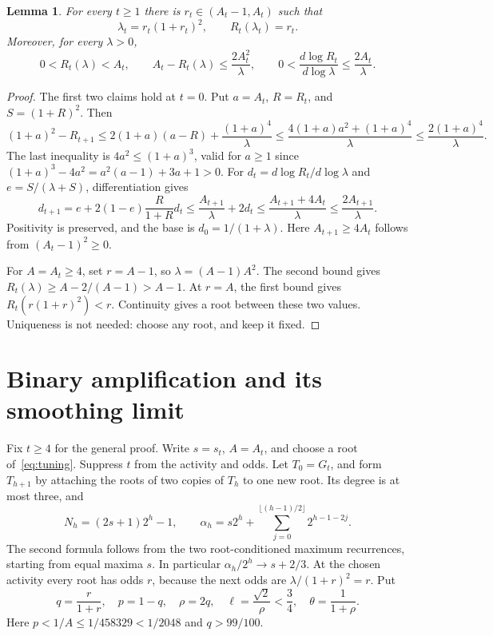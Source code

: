 \documentclass[11pt]{article}
\newtheorem{lemma}[theorem]{Lemma}
\begin{document}
\begin{lemma}\label{lem:tuning}
For every $t\ge1$ there is $r_t\in(A_t-1,A_t)$ such that
\begin{equation}\label{eq:tuning}
 \lambda_t=r_t(1+r_t)^2,\qquad R_t(\lambda_t)=r_t.
\end{equation}
Moreover, for every $\lambda>0$,
\begin{equation}\label{eq:gadgetbounds}
 0<R_t(\lambda)<A_t,\qquad
 A_t-R_t(\lambda)\le\frac{2A_t^2}{\lambda},\qquad
 0<\frac{d\log R_t}{d\log\lambda}\le\frac{2A_t}{\lambda}.
\end{equation}
\end{lemma}
\begin{proof}
The first two claims hold at $t=0$. Put $a=A_t$, $R=R_t$, and
$S=(1+R)^2$. Then
\[
 (1+a)^2-R_{t+1}
 \le2(1+a)(a-R)+\frac{(1+a)^4}{\lambda}
 \le\frac{4(1+a)a^2+(1+a)^4}{\lambda}
 \le\frac{2(1+a)^4}{\lambda}.
\]
The last inequality is $4a^2\le(1+a)^3$, valid for $a\ge1$ since
$(1+a)^3-4a^2=a^2(a-1)+3a+1>0$.
For $d_t=d\log R_t/d\log\lambda$ and
$e=S/(\lambda+S)$, differentiation gives
\[
 d_{t+1}=e+2(1-e)\frac{R}{1+R}d_t
 \le\frac{A_{t+1}}{\lambda}+2d_t
 \le\frac{A_{t+1}+4A_t}{\lambda}
 \le\frac{2A_{t+1}}{\lambda}.
\]
Positivity is preserved, and the base is $d_0=1/(1+\lambda)$.
Here $A_{t+1}\ge4A_t$ follows from $(A_t-1)^2\ge0$.

For $A=A_t\ge4$, set $r=A-1$, so $\lambda=(A-1)A^2$.
The second bound gives $R_t(\lambda)\ge A-2/(A-1)>A-1$.
At $r=A$, the first bound gives $R_t(r(1+r)^2)<r$.
Continuity gives a root between these two values. Uniqueness is not
needed: choose any root, and keep it fixed.
\end{proof}

\section{Binary amplification and its smoothing limit}
Fix $t\ge4$ for the general proof. Write $s=s_t$, $A=A_t$, and choose
a root of~\eqref{eq:tuning}. Suppress $t$ from the activity and odds.
Let $T_0=G_t$, and form $T_{h+1}$ by attaching the roots of two copies
of $T_h$ to one new root. Its degree is at most three, and
\begin{equation}\label{eq:orders}
 N_h=(2s+1)2^h-1,\qquad
 \alpha_h=s2^h+\sum_{j=0}^{\lfloor(h-1)/2\rfloor}2^{h-1-2j}.
\end{equation}
The second formula follows from the two root-conditioned maximum
recurrences, starting from equal maxima $s$. In particular
$\alpha_h/2^h\to s+2/3$.
At the chosen activity every root has odds $r$, because the next odds
are $\lambda/(1+r)^2=r$. Put
\begin{equation}\label{eq:parameters}
 q=\frac r{1+r},\quad p=1-q,\quad \rho=2q,\quad
 \ell=\frac{\sqrt2}{\rho}<\frac34,\quad
 \theta=\frac1{1+\rho}.
\end{equation}
Here $p<1/A\le1/458329<1/2048$ and $q>99/100$.
\end{document}
